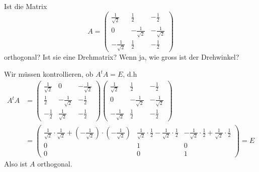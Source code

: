 Ist die Matrix
\[
A=
\begin{pmatrix}
\frac1{\sqrt{2}}&\frac12&-\frac12\\
0&-\frac1{\sqrt{2}}&-\frac1{\sqrt{2}}\\
-\frac1{\sqrt{2}}&\frac12&-\frac12
\end{pmatrix}
\]
orthogonal? Ist sie eine Drehmatrix?  Wenn ja, wie gross ist der Drehwinkel?


\begin{loesung}
Wir müssen kontrollieren, ob $A^tA=E$, d.h
\begin{align*}
A^tA&=
\begin{pmatrix}
\frac1{\sqrt{2}}&0&-\frac1{\sqrt{2}}\\
\frac12&-\frac1{\sqrt{2}}&-\frac12\\
-\frac12&\frac1{\sqrt{2}}&-\frac12
\end{pmatrix}
\begin{pmatrix}
\frac1{\sqrt{2}}&\frac12&-\frac12\\
0&-\frac1{\sqrt{2}}&-\frac1{\sqrt{2}}\\
-\frac1{\sqrt{2}}&\frac12&-\frac12
\end{pmatrix}
\\
&=
\begin{pmatrix}
\frac1{\sqrt{2}}\cdot\frac1{\sqrt{2}} + (-\frac1{\sqrt{2}})\cdot(-\frac1{\sqrt{2}})
        &\frac1{\sqrt{2}}\cdot\frac12-\frac1{\sqrt{2}}\cdot\frac12
                &-\frac1{\sqrt{2}}\cdot\frac12+\frac1{\sqrt{2}}\cdot\frac12\\
0&1&0\\
0&0&1
\end{pmatrix}=E
\end{align*}
Also ist $A$ orthogonal.


\end{loesung}
